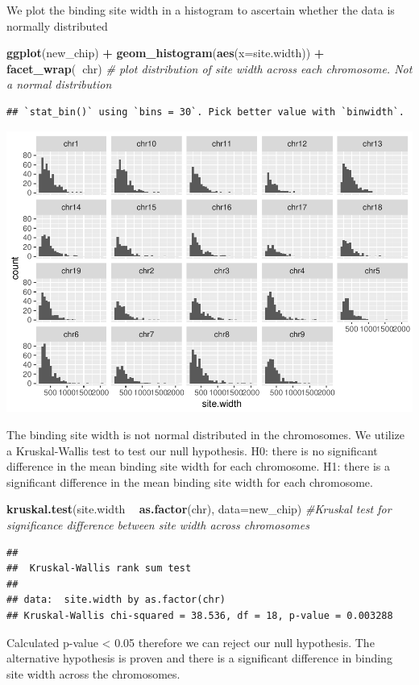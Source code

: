 \documentclass[]{article}
\newenvironment{Shaded}{\begin{snugshade}}{\end{snugshade}}
\newcommand{\KeywordTok}[1]{\textcolor[rgb]{0.13,0.29,0.53}{\textbf{#1}}}
\newcommand{\DataTypeTok}[1]{\textcolor[rgb]{0.13,0.29,0.53}{#1}}
\newcommand{\StringTok}[1]{\textcolor[rgb]{0.31,0.60,0.02}{#1}}
\newcommand{\CommentTok}[1]{\textcolor[rgb]{0.56,0.35,0.01}{\textit{#1}}}
\newcommand{\OperatorTok}[1]{\textcolor[rgb]{0.81,0.36,0.00}{\textbf{#1}}}
\newcommand{\NormalTok}[1]{#1}
\begin{document}
We plot the binding site width in a histogram to ascertain whether the
data is normally distributed

\begin{Shaded}
\begin{Highlighting}[]
\KeywordTok{ggplot}\NormalTok{(new_chip) }\OperatorTok{+}\StringTok{ }\KeywordTok{geom_histogram}\NormalTok{(}\KeywordTok{aes}\NormalTok{(}\DataTypeTok{x=}\NormalTok{site.width)) }\OperatorTok{+}\StringTok{ }\KeywordTok{facet_wrap}\NormalTok{(}\OperatorTok{~}\NormalTok{chr) }\CommentTok{# plot distribution of site width across each chromosome. Not a normal distribution}
\end{Highlighting}
\end{Shaded}

\begin{verbatim}
## `stat_bin()` using `bins = 30`. Pick better value with `binwidth`.
\end{verbatim}

\includegraphics{Hw1_without_solutions_files/figure-latex/unnamed-chunk-6-1.pdf}

The binding site width is not normal distributed in the chromosomes. We
utilize a Kruskal-Wallis test to test our null hypothesis. H0: there is
no significant difference in the mean binding site width for each
chromosome. H1: there is a significant difference in the mean binding
site width for each chromosome.

\begin{Shaded}
\begin{Highlighting}[]
\KeywordTok{kruskal.test}\NormalTok{(site.width }\OperatorTok{~}\StringTok{ }\KeywordTok{as.factor}\NormalTok{(chr), }\DataTypeTok{data=}\NormalTok{new_chip) }\CommentTok{#Kruskal test for significance difference between site width across chromosomes}
\end{Highlighting}
\end{Shaded}

\begin{verbatim}
## 
##  Kruskal-Wallis rank sum test
## 
## data:  site.width by as.factor(chr)
## Kruskal-Wallis chi-squared = 38.536, df = 18, p-value = 0.003288
\end{verbatim}

Calculated p-value \textless{} 0.05 therefore we can reject our null
hypothesis. The alternative hypothesis is proven and there is a
significant difference in binding site width across the chromosomes.
\end{document}
